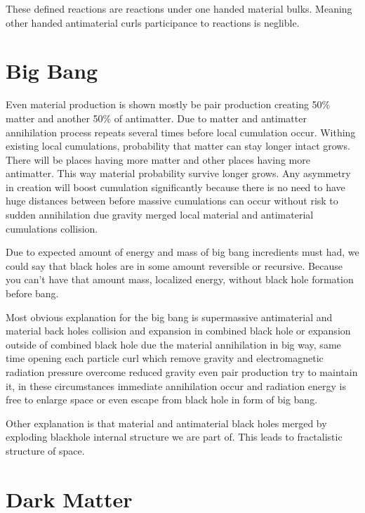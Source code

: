 These defined reactions are reactions under one handed material bulks. Meaning
other handed antimaterial curls participance to reactions is neglible.

\section{Big Bang}
\label{big_bang}

Even material production is shown mostly be pair production creating 50\%
matter and another 50\% of antimatter. Due to matter and antimatter
annihilation process repeats several times before local cumulation occur.
Withing existing local cumulations, probability that matter can stay longer
intact grows. There will be places having more matter and other places having
more antimatter. This way material probability survive longer grows. Any
asymmetry in creation will boost cumulation significantly because there is no
need to have huge distances between before massive cumulations can occur
without risk to sudden annihilation due gravity merged local material and
antimaterial cumulations collision.

Due to expected amount of energy and mass of big bang incredients must had,
we could say that black holes are in some amount reversible or recursive.
Because you can't have that amount mass, localized energy, without black hole
formation before bang.

Most obvious explanation for the big bang is supermassive antimaterial and
material back holes collision and expansion in combined black hole or
expansion outside of combined black hole due the material annihilation in big
way, same time opening each particle curl which remove gravity and
electromagnetic radiation pressure overcome reduced gravity even pair
production try to maintain it, in these circumstances immediate annihilation
occur and radiation energy is free to enlarge space or even escape from black
hole in form of big bang.

Other explanation is that material and antimaterial black holes merged by
exploding blackhole internal structure we are part of. This leads to
fractalistic structure of space.


\section{Dark Matter}
\label{dark_matter}


